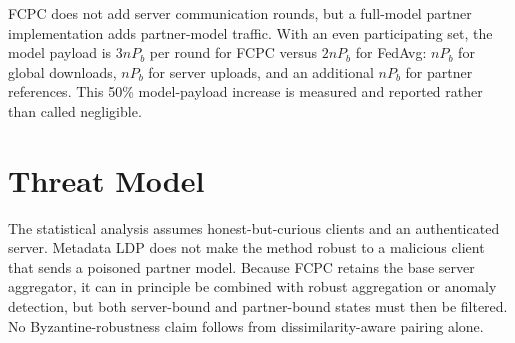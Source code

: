 \documentclass[journal,twoside,web]{ieeecolor}
\begin{document}
FCPC does not add server communication rounds, but a full-model partner
implementation adds partner-model traffic. With an even participating set,
the model payload is $3nP_b$ per round for FCPC versus $2nP_b$ for FedAvg:
$nP_b$ for global downloads, $nP_b$ for server uploads, and an additional
$nP_b$ for partner references. This 50\% model-payload increase is measured
and reported rather than called negligible.

\section{Threat Model}

The statistical analysis assumes honest-but-curious clients and an
authenticated server. Metadata LDP does not make the method robust to a
malicious client that sends a poisoned partner model. Because FCPC retains
the base server aggregator, it can in principle be combined with robust
aggregation or anomaly detection, but both server-bound and partner-bound
states must then be filtered. No Byzantine-robustness claim follows from
dissimilarity-aware pairing alone.



\end{document}
